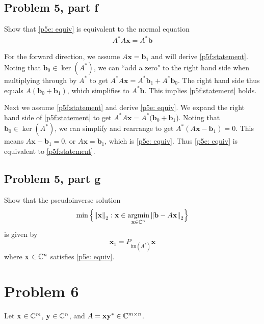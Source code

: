 \newpage
\subsection{Problem 5, part f}
Show that \ref{p5e: equiv} is equivalent to the normal equation
\begin{align}
A^*A\textbf{x} = A^*\textbf{b} \label{p5f:statement} 
\end{align}


\partbreak
\begin{solution}

For the forward direction, we assume $A\textbf{x} = \textbf{b}_1$ and will derive \ref{p5f:statement}. Noting that $\textbf{b}_0 \in \ker(A^*)$, we can ``add a zero"  to the right hand side when multiplying through by $A^*$ to get  $A^*A\textbf{x} = A^*\textbf{b}_1 + A^*\textbf{b}_0$. The right hand side thus equals $A(\textbf{b}_0 + \textbf{b}_1)$, which simplifies to $A^*\textbf{b}$. This implies \ref{p5f:statement} holds. 

\jump
Next we assume \ref{p5f:statement} and derive \ref{p5e: equiv}.  We expand the right hand side of \ref{p5f:statement} to get $A^*A\textbf{x} = A^*(\textbf{b}_0 + \textbf{b}_1$). Noting that $\textbf{b}_0 \in \ker(A^*)$, we can simplify and rearrange to get $A^*(A\textbf{x} - \textbf{b}_1) = 0$. This means $A\textbf{x} - \textbf{b}_1 = 0$, or $A\textbf{x} = \textbf{b}_1$, which is \ref{p5e: equiv}. Thus \ref{p5e: equiv} is equivalent to \ref{p5f:statement}.
\end{solution}

\subsection{Problem 5, part g}
Show that the pseudoinverse solution
\[
\min \Big\{ \norm{\textbf{x}}_2 : \textbf{x} \in \operatorname*{argmin}_{\textbf{x} \in \mathbb{C}^n}\norm{\textbf{b} - A\textbf{x}}_2\Big\}
\]
is given by
\[
\textbf{x}_1 = P_{\text{im}(A^*)}\textbf{x}
\]
where \textbf{x} $\in \mathbb{C}^n$ satisfies \ref{p5e: equiv}.

\partbreak
\begin{solution}

    
\end{solution}

\newpage
\section{Problem 6}
Let \textbf{x} $\in \mathbb{C}^m$, \textbf{y} $\in \mathbb{C}^n$, and $A = \textbf{x}\textbf{y}^* \in \mathbb{C}^{m\times n}$.

